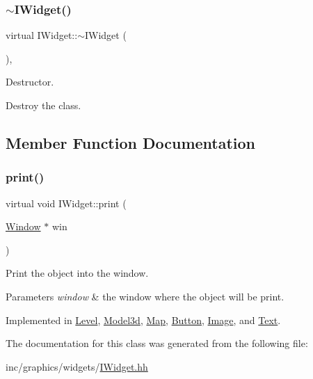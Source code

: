 \subsubsection{\texorpdfstring{$\sim$\+I\+Widget()}{~IWidget()}}
{\footnotesize\ttfamily virtual I\+Widget\+::$\sim$\+I\+Widget (\begin{DoxyParamCaption}{ }\end{DoxyParamCaption})\hspace{0.3cm}{\ttfamily [inline]}, {\ttfamily [virtual]}}



Destructor. 

Destroy the class. 

\subsection{Member Function Documentation}
\mbox{\label{classIWidget_a0cfa49a402e9bb31808a715e048ab2f4}} 
\subsubsection{\texorpdfstring{print()}{print()}}
{\footnotesize\ttfamily virtual void I\+Widget\+::print (\begin{DoxyParamCaption}\item[{\hyperlink{classWindow}{Window} $\ast$}]{win }\end{DoxyParamCaption})\hspace{0.3cm}{\ttfamily [pure virtual]}}



Print the object into the window. 


\begin{DoxyParams}{Parameters}
{\em \textquotesingle{}window\textquotesingle{}} & the window where the object will be print. \\
\hline
\end{DoxyParams}


Implemented in \hyperlink{classLevel_ab8311fe64b7957d627053359331b0b6b}{Level}, \hyperlink{classModel3d_ae02d86ac82ec9f435cf1ebe668f3a6dd}{Model3d}, \hyperlink{classMap_a031a9bf528b1d14c60931d37d68bb4e3}{Map}, \hyperlink{classButton_aaee0c62414711ae91084b05b38d0c8c5}{Button}, \hyperlink{classImage_aca043fb78326d6ce135498419e2d1833}{Image}, and \hyperlink{classText_ab2be08831f604b8a957d540087ba4741}{Text}.



The documentation for this class was generated from the following file\+:\begin{DoxyCompactItemize}
\item 
inc/graphics/widgets/\hyperlink{IWidget_8hh}{I\+Widget.\+hh}\end{DoxyCompactItemize}
